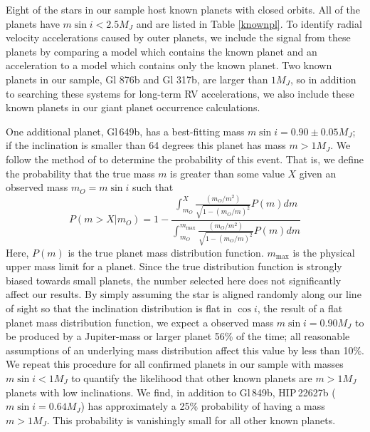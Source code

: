Eight of the stars in our sample host known planets with closed orbits. All of the planets have $m \sin i < 2.5 M_J$ and are listed in Table \ref{knownpl}. To identify radial velocity accelerations caused by outer planets, we include the signal from these planets by comparing a model which contains the known planet and an acceleration to a model which contains only the known planet. Two known planets in our sample, Gl 876b and Gl 317b, are larger than $1 M_J$, so in addition to searching these systems for long-term RV accelerations, we also include these known planets in our giant planet occurrence calculations.
 

One additional planet, Gl\,649b, has a best-fitting mass $m \sin i = 0.90 \pm 0.05 M_J$; if the inclination is smaller than 64 degrees this planet has mass $ m > 1 M_J$. We follow the method of \citet{Ho11} to determine the probability of this event. That is, we define the probability that the true mass $m$ is greater than some value $X$ given an observed mass $m_O = m \sin i$ such that
\begin{equation}
P(m > X | m_O) = 1 - \frac{\int_{m_O}^X \frac{(m_O/m^2)}
{\sqrt{1-(m_O/m)^2}}P(m)dm}{\int_{m_O}^{m_\textrm{max}}
\frac{(m_O/m^2)}{\sqrt{1-(m_O/m)^2}}P(m)dm}
\end{equation}
Here, $P(m)$ is the true planet mass distribution function.
$m_\textrm{max}$ is the physical upper mass limit for a planet. Since the true distribution function is strongly biased towards small planets, the number selected here does not significantly affect our results. By simply assuming the star is aligned randomly along our line of sight so that the inclination distribution is flat in $\cos i$, the result of a flat planet mass distribution function, we expect a observed mass $m \sin i = 0.90 M_J$ to be produced by a Jupiter-mass or larger planet 56\% of the time; all reasonable assumptions of an underlying mass distribution affect this value by less than 10\%. We repeat this procedure for all confirmed planets in our sample with masses $m \sin i < 1 M_J$ to quantify the likelihood that other known planets are $m > 1 M_J$ planets with low inclinations. We find, in addition to Gl\,849b, HIP\,22627b ($m \sin i = 0.64 M_J$) has approximately a 25\% probability of having a mass $m > 1 M_J$. This probability is vanishingly small for all other known planets.


